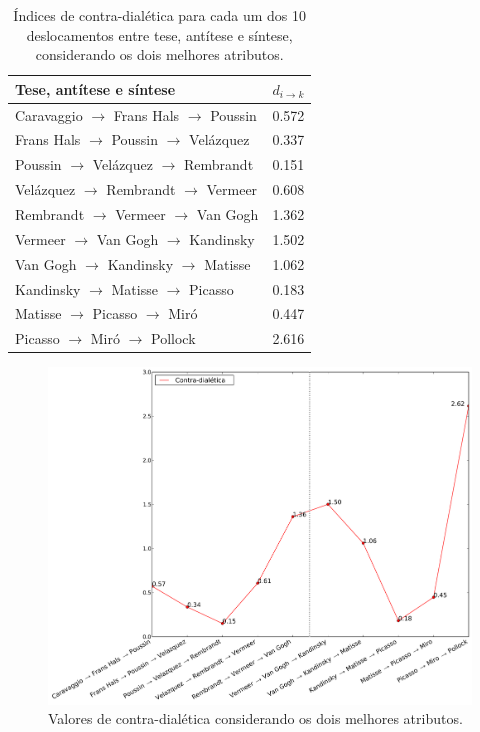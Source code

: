 \begin{table}[ht]
  \begin{center}
  \caption{\label{tab:dialetica1} Índices de contra-dialética para cada um dos
    10 deslocamentos entre tese, antítese e síntese, considerando os dois
    melhores atributos.}
\begin{tabular}{@{}ll}
  
    \hline \hline
    Tese, antítese e síntese & $d_{i \rightarrow k}$ \\
    \hline
    Caravaggio $\to$ Frans Hals $\to$ Poussin   & 0.572 \\
    Frans Hals $\to$ Poussin $\to$ Vel\'{a}zquez & 0.337 \\
    Poussin $\to$ Vel\'{a}zquez $\to$ Rembrandt  & 0.151 \\
    Vel\'{a}zquez $\to$ Rembrandt $\to$ Vermeer  & 0.608 \\
    Rembrandt $\to$ Vermeer $\to$ Van Gogh      & 1.362 \\
    Vermeer $\to$ Van Gogh $\to$ Kandinsky      & 1.502 \\
    Van Gogh $\to$ Kandinsky $\to$ Matisse      & 1.062 \\
    Kandinsky $\to$ Matisse $\to$ Picasso       & 0.183 \\
    Matisse $\to$ Picasso $\to$ Mir\'{o}         & 0.447 \\
    Picasso $\to$ Mir\'{o} $\to$ Pollock         & 2.616 \\
    \hline \hline
  \end{tabular}
  \fonteminha
\end{center}
\end{table}


\begin{figure}[h!]
\begin{center}
       \caption{Valores de contra-dialética considerando os dois melhores atributos.}
        \label{fig:caso1_dialetica}
        \includegraphics[width=\columnwidth]{figs/caso1_dialetica}
        \fonteminha
\end{center}
\end{figure}

